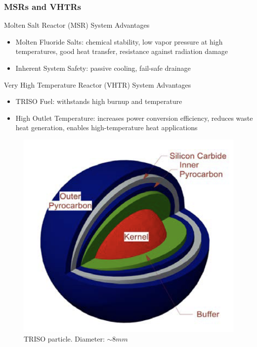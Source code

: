 \begin{frame}
  \frametitle{MSRs and VHTRs}
  \begin{block}{Molten Salt Reactor (MSR) System Advantages}
    \begin{itemize}
      \item Molten Fluoride Salts: chemical stability, low vapor pressure at 
      high temperatures, good heat transfer, resistance against radiation damage
      \item Inherent System Safety: passive cooling, fail-safe drainage
    \end{itemize}
  \end{block}
  \vspace{-0.25cm}
  \begin{block}{Very High Temperature Reactor (VHTR) System Advantages}
    \begin{itemize}
      \item TRISO Fuel: withstands high burnup and temperature
      \item High Outlet Temperature: increases power conversion efficiency, reduces 
      waste heat generation, enables high-temperature heat applications 
    \end{itemize}
  \end{block}
  \begin{figure}[htbp!]
    \includegraphics[width=0.2\linewidth]{../docs/figures/ahtr-triso.png}
    \caption{TRISO particle. Diameter: $\sim 8mm$}
\end{figure}
\end{frame}
